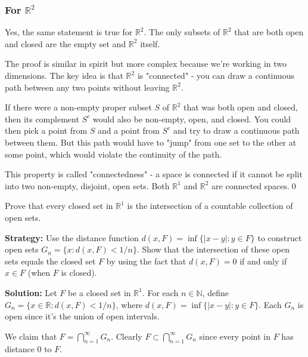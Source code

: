 \subsubsection*{For $\mathbb{R}^2$}

Yes, the same statement is true for $\mathbb{R}^2$. The only subsets of $\mathbb{R}^2$ that are both open and closed are the empty set and $\mathbb{R}^2$ itself.

The proof is similar in spirit but more complex because we're working in two dimensions. The key idea is that $\mathbb{R}^2$ is "connected" - you can draw a continuous path between any two points without leaving $\mathbb{R}^2$.

If there were a non-empty proper subset $S$ of $\mathbb{R}^2$ that was both open and closed, then its complement $S^c$ would also be non-empty, open, and closed. You could then pick a point from $S$ and a point from $S^c$ and try to draw a continuous path between them. But this path would have to "jump" from one set to the other at some point, which would violate the continuity of the path.

This property is called "connectedness" - a space is connected if it cannot be split into two non-empty, disjoint, open sets. Both $\mathbb{R}^1$ and $\mathbb{R}^2$ are connected spaces.\qed


\begin{problembox}
\begin{problemstatement}
Prove that every closed set in $\mathbb{R}^1$ is the intersection of a countable collection of open sets.
\end{problemstatement}
\end{problembox}

\noindent\textbf{Strategy:} Use the distance function $d(x,F) = \inf\{|x-y| : y \in F\}$ to construct open sets $G_n = \{x : d(x,F) < 1/n\}$. Show that the intersection of these open sets equals the closed set $F$ by using the fact that $d(x,F) = 0$ if and only if $x \in F$ (when $F$ is closed).

\bigskip\noindent\textbf{Solution:} Let $F$ be a closed set in $\mathbb{R}^1$. For each $n \in \mathbb{N}$, define $G_n = \{x \in \mathbb{R} : d(x,F) < 1/n\}$, where $d(x,F) = \inf\{|x-y| : y \in F\}$. Each $G_n$ is open since it's the union of open intervals.

We claim that $F = \bigcap_{n=1}^{\infty} G_n$. Clearly $F \subset \bigcap_{n=1}^{\infty} G_n$ since every point in $F$ has distance 0 to $F$.

